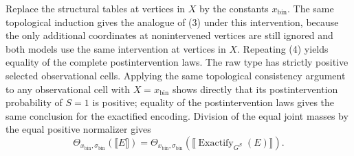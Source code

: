 Replace the structural tables at vertices in \(X\) by the constants \(x_{\mathrm{bin}}\).  The same topological induction gives the analogue of (3) under this intervention, because the only additional coordinates at nonintervened vertices are still ignored and both models use the same intervention at vertices in \(X\).  Repeating (4) yields equality of the complete postintervention laws.  The raw type has strictly positive selected observational cells.  Applying the same topological consistency argument to any observational cell with \(X=x_{\mathrm{bin}}\) shows directly that its postintervention probability of \(S=1\) is positive; equality of the postintervention laws gives the same conclusion for the exactified encoding.  Division of the equal joint masses by the equal positive normalizer gives
\[
 \Theta_{x_{\mathrm{bin}},\sigma_{\mathrm{bin}}}(\llbracket E\rrbracket)
 =\Theta_{x_{\mathrm{bin}},\sigma_{\mathrm{bin}}}
   (\llbracket\operatorname{Exactify}_{G^S}(E)\rrbracket).
\]